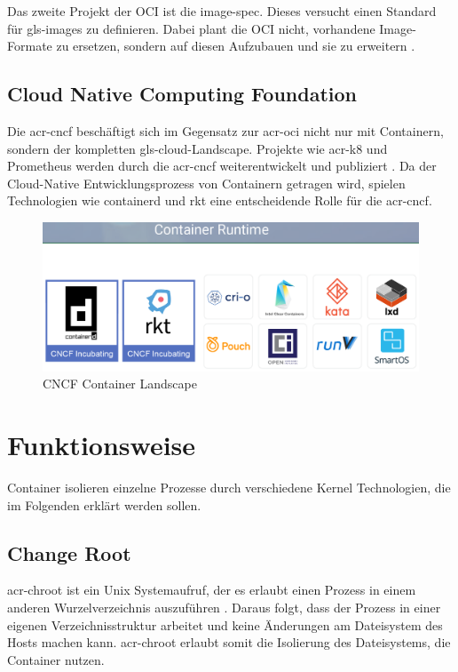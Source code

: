 Das zweite Projekt der OCI ist die image-spec. Dieses versucht einen Standard für \glspl{gls-image} zu definieren. Dabei plant die OCI nicht, vorhandene Image-Formate zu ersetzen, sondern auf diesen Aufzubauen und sie zu erweitern \citep{OpenContainerInitiative}.

\subsection{Cloud Native Computing Foundation}
\label{sec:cncf}
Die \gls{acr-cncf} beschäftigt sich im Gegensatz zur \gls{acr-oci} nicht nur mit Containern, sondern der kompletten \gls{gls-cloud}-Landscape. Projekte wie \gls{acr-k8} und Prometheus werden durch die \gls{acr-cncf} weiterentwickelt und publiziert \citep{CloudNativeComputingFoundation}. Da der Cloud-Native Entwicklungsprozess von Containern getragen wird, spielen Technologien wie containerd und rkt eine entscheidende Rolle für die \gls{acr-cncf}.

\begin{figure}[h]
	\begin{center}
		\includegraphics[scale=0.3]{bilder/cncf-container-landscape.png}
		\caption{CNCF Container Landscape \citep{CNCFCloudNativeInteractiveLandscape}}
		\label{fig:cncfContainerLandscape}
	\end{center}
\end{figure}


\section{Funktionsweise}
\label{sec:funktionsweise}

Container isolieren einzelne Prozesse durch verschiedene Kernel Technologien, die im Folgenden erklärt werden sollen.
\subsection{Change Root}
\label{sec:chroot}
\Gls{acr-chroot} ist ein Unix Systemaufruf, der es erlaubt einen Prozess in einem anderen Wurzelverzeichnis auszuführen \citep{Chroot1LinuxManualPage}. Daraus folgt, dass der Prozess in einer eigenen Verzeichnisstruktur arbeitet und keine Änderungen am Dateisystem des Hosts machen kann. \Gls{acr-chroot} erlaubt somit die Isolierung des Dateisystems, die Container nutzen.

